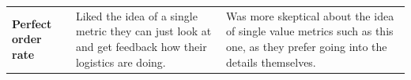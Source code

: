 \documentclass{imc-inf}
\begin{document}
\begin{longtable}{@{}>{\raggedright\arraybackslash}p{3cm}p{5.75cm}p{5.75cm}@{}}
  \textbf{Perfect order rate}                                                                                                                                                                                                                                                                                                                                                                                                                                                                                                                                                                                                                                                                                                                                                                                                                                                                                  &
  Liked the idea of a single metric they can just look at and get feedback how their logistics are doing.                                                                                                                                                                                                                                                                                                                                                                                                                                                                                                                                                                                                                                                                                                                                                                                                      &
  Was more skeptical about the idea of single value metrics such as this one, as they prefer going into the details themselves.                                                                                                                                                                                                                                                                                                                                                                                                                                                                                                                                                                                                                                                                                                                                                                                                                            \\[6pt]


\end{longtable}
\end{document}
